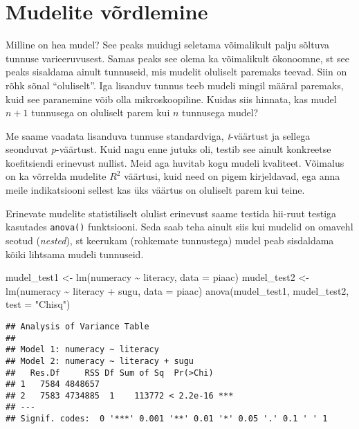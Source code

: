 \documentclass[
]{book}
\newenvironment{Shaded}{\begin{snugshade}}{\end{snugshade}}
\newcommand{\AttributeTok}[1]{\textcolor[rgb]{0.77,0.63,0.00}{#1}}
\newcommand{\FunctionTok}[1]{\textcolor[rgb]{0.00,0.00,0.00}{#1}}
\newcommand{\NormalTok}[1]{#1}
\newcommand{\OtherTok}[1]{\textcolor[rgb]{0.56,0.35,0.01}{#1}}
\newcommand{\SpecialCharTok}[1]{\textcolor[rgb]{0.00,0.00,0.00}{#1}}
\newcommand{\StringTok}[1]{\textcolor[rgb]{0.31,0.60,0.02}{#1}}
\begin{document}
\hypertarget{mudelite-vuxf5rdlemine}{%
\section{Mudelite võrdlemine}\label{mudelite-vuxf5rdlemine}}

Milline on hea mudel? See peaks muidugi seletama võimalikult palju sõltuva tunnuse varieeruvusest. Samas peaks see olema ka võimalikult ökonoomne, st see peaks sisaldama ainult tunnuseid, mis mudelit oluliselt paremaks teevad. Siin on rõhk sõnal ``oluliselt''. Iga lisanduv tunnus teeb mudeli mingil määral paremaks, kuid see paranemine võib olla mikroskoopiline. Kuidas siis hinnata, kas mudel \(n+1\) tunnusega on oluliselt parem kui \(n\) tunnusega mudel?

Me saame vaadata lisanduva tunnuse standardviga, \emph{t}-väärtust ja sellega seonduvat \emph{p}-väärtust. Kuid nagu enne jutuks oli, testib see ainult konkreetse koefitsiendi erinevust nullist. Meid aga huvitab kogu mudeli kvaliteet. Võimalus on ka võrrelda mudelite \(R^2\) väärtusi, kuid need on pigem kirjeldavad, ega anna meile indikatsiooni sellest kas üks väärtus on oluliselt parem kui teine.

Erinevate mudelite statistiliselt olulist erinevust saame testida hii-ruut testiga kasutades \texttt{anova()} funktsiooni. Seda saab teha ainult siis kui mudelid on omavehl seotud (\emph{nested}), st keerukam (rohkemate tunnustega) mudel peab sisdaldama kõiki lihtsama mudeli tunnuseid.

\begin{Shaded}
\begin{Highlighting}[]
\NormalTok{mudel\_test1 }\OtherTok{\textless{}{-}} \FunctionTok{lm}\NormalTok{(numeracy }\SpecialCharTok{\textasciitilde{}}\NormalTok{ literacy, }\AttributeTok{data =}\NormalTok{ piaac)}
\NormalTok{mudel\_test2 }\OtherTok{\textless{}{-}} \FunctionTok{lm}\NormalTok{(numeracy }\SpecialCharTok{\textasciitilde{}}\NormalTok{ literacy }\SpecialCharTok{+}\NormalTok{ sugu, }\AttributeTok{data =}\NormalTok{ piaac)}
\FunctionTok{anova}\NormalTok{(mudel\_test1, mudel\_test2, }\AttributeTok{test =} \StringTok{"Chisq"}\NormalTok{)}
\end{Highlighting}
\end{Shaded}

\begin{verbatim}
## Analysis of Variance Table
## 
## Model 1: numeracy ~ literacy
## Model 2: numeracy ~ literacy + sugu
##   Res.Df     RSS Df Sum of Sq  Pr(>Chi)    
## 1   7584 4848657                           
## 2   7583 4734885  1    113772 < 2.2e-16 ***
## ---
## Signif. codes:  0 '***' 0.001 '**' 0.01 '*' 0.05 '.' 0.1 ' ' 1
\end{verbatim}
\end{document}
